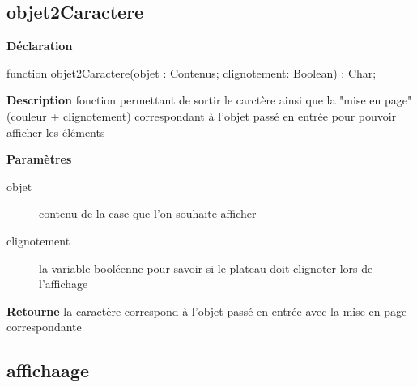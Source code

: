 \documentclass{report}
\newif\ifpdf
\begin{document}
\subsection*{objet2Caractere}
\fi
\label{Affichage-objet2Caractere}
\begin{list}{}{
\setlength{\itemindent}{0cm}
\setlength{\listparindent}{0cm}
\setlength{\leftmargin}{\evensidemargin}
\addtolength{\leftmargin}{\tmplength}
\settowidth{\labelsep}{X}
\addtolength{\leftmargin}{\labelsep}
\setlength{\labelwidth}{\tmplength}
}
\item[\textbf{Déclaration}\hfill]
\ifpdf
\begin{flushleft}
\fi
\begin{ttfamily}
function objet2Caractere(objet : Contenus; clignotement: Boolean) : Char;\end{ttfamily}

\ifpdf
\end{flushleft}
\fi

\par
\item[\textbf{Description}]
fonction permettant de sortir le carctère ainsi que la "mise en page" (couleur + clignotement) correspondant à l'objet passé en entrée pour pouvoir afficher les éléments   \par
\item[\textbf{Paramètres}]
\begin{description}
\item[objet] contenu de la case que l'on souhaite afficher
\item[clignotement] la variable booléenne pour savoir si le plateau doit clignoter lors de l'affichage
\end{description}
\item[\textbf{Retourne}]la caractère correspond à l'objet passé en entrée avec la mise en page correspondante


\end{list}
\ifpdf
\subsection*{\large{\textbf{affichaage}}\normalsize\hspace{1ex}\hrulefill}
\else
\end{document}
